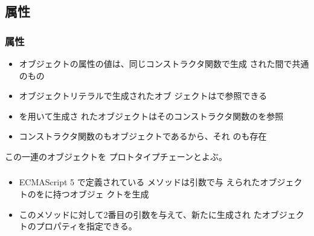 \documentclass[dvipsk]{beamer}
\begin{document}
\subsection{\protect{}属性}
\begin{frame}[containsverbatim]
 \frametitle{\protect{}属性}
 \begin{itemize}
  \item オブジェクトの属性の値は、同じコンストラクタ関数で生成
 された間で共通のもの
  \item オブジェクトリテラルで生成されたオブ
 ジェクトはで参照できる
  \item {}を用いて生成さ
 れたオブジェクトはそのコンストラクタ関数のを参照
  \item コンストラクタ関数のもオブジェクトであるから、それ
 のも存在
 \end{itemize}
 この一連のオブジェクトを
 プロトタイプチェーンとよぶ。
 \end{frame}
\begin{frame}[containsverbatim]
 \frametitle{\protect{}}
 \begin{itemize}
  \item ECMAScript 5 で定義されている  メソッドは引数で与
 えられたオブジェクトのをに持つオブジェ
        クトを生成
  \item このメソッドに対して2番目の引数を与えて、新たに生成され
 たオブジェクトのプロパティを指定できる。
 \end{itemize}
 \end{frame}
\end{document}
